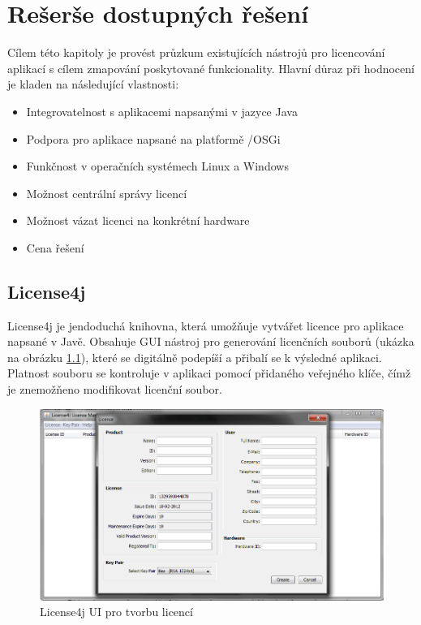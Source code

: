 \chapter{Rešerše dostupných řešení}

Cílem této kapitoly je provést průzkum existujících nástrojů pro licencování
aplikací s cílem zmapování poskytované funkcionality. Hlavní důraz při hodnocení
je kladen na následující vlastnosti:

\begin{itemize}
  \item Integrovatelnost s aplikacemi napsanými v jazyce Java
  \item Podpora pro aplikace napsané na platformě
  /\gls{OSGi}
  \item Funkčnost v operačních systémech Linux a Windows
  \item Možnost centrální správy licencí
  \item Možnost vázat licenci na konkrétní hardware
  \item Cena řešení 
\end{itemize}


\section{License4j}

License4j\cite{license4j} je jendoduchá knihovna, která umožňuje vytvářet
licence pro aplikace napsané v Javě. Obsahuje \gls{GUI} nástroj pro generování
licenčních souborů (ukázka na obrázku \ref{fig:license4j-ui}), které se digitálně podepíší a
přibalí se k výsledné aplikaci. Platnost souboru se kontroluje v aplikaci pomocí přidaného veřejného
klíče, čímž je znemožňeno modifikovat licenční soubor.

\begin{figure}[TB]
\begin{center}
\includegraphics[width=12cm]{figures/license4j.PNG}
\caption{License4j UI pro tvorbu licencí}
\label{fig:license4j-ui} 
\end{center}
\end{figure}

